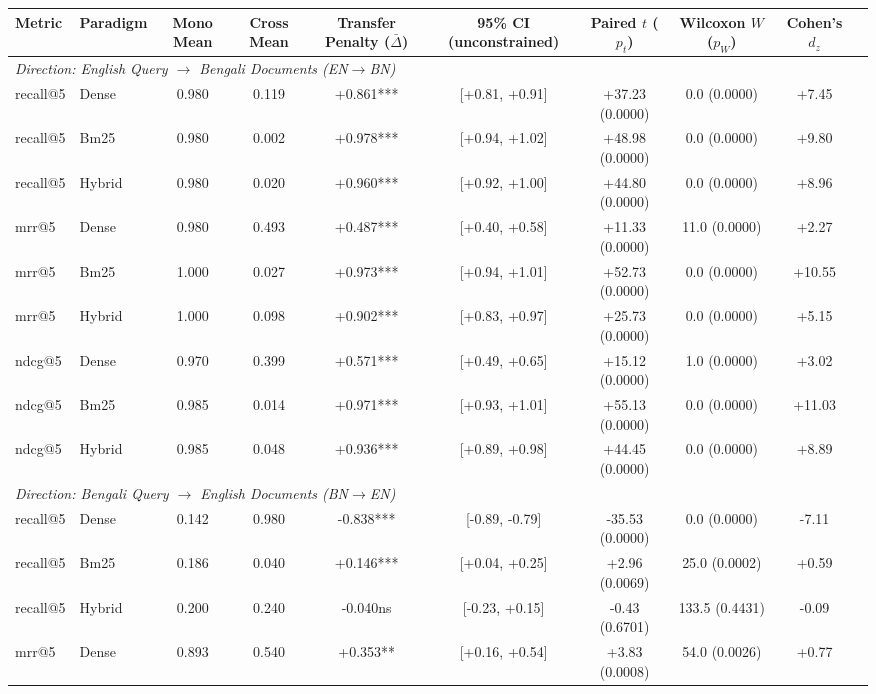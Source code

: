 \begin{table}[t]
\centering
\small
\begin{tabular}{llcccccccc}
\toprule
\textbf{Metric} & \textbf{Paradigm} & \textbf{Mono Mean} & \textbf{Cross Mean} & \textbf{Transfer Penalty ($\bar{\Delta}$)} & \textbf{95\% CI (unconstrained)} & \textbf{Paired $t$ ($p_t$)} & \textbf{Wilcoxon $W$ ($p_W$)} & \textbf{Cohen's $d_z$} \\
\midrule
\multicolumn{9}{l}{\textit{Direction: English Query $\to$ Bengali Documents (EN$\to$BN)}} \\
recall@5 & Dense & 0.980 & 0.119 & +0.861*** & [+0.81, +0.91] & +37.23 (0.0000) & 0.0 (0.0000) & +7.45 \\
recall@5 & Bm25 & 0.980 & 0.002 & +0.978*** & [+0.94, +1.02] & +48.98 (0.0000) & 0.0 (0.0000) & +9.80 \\
recall@5 & Hybrid & 0.980 & 0.020 & +0.960*** & [+0.92, +1.00] & +44.80 (0.0000) & 0.0 (0.0000) & +8.96 \\
mrr@5 & Dense & 0.980 & 0.493 & +0.487*** & [+0.40, +0.58] & +11.33 (0.0000) & 11.0 (0.0000) & +2.27 \\
mrr@5 & Bm25 & 1.000 & 0.027 & +0.973*** & [+0.94, +1.01] & +52.73 (0.0000) & 0.0 (0.0000) & +10.55 \\
mrr@5 & Hybrid & 1.000 & 0.098 & +0.902*** & [+0.83, +0.97] & +25.73 (0.0000) & 0.0 (0.0000) & +5.15 \\
ndcg@5 & Dense & 0.970 & 0.399 & +0.571*** & [+0.49, +0.65] & +15.12 (0.0000) & 1.0 (0.0000) & +3.02 \\
ndcg@5 & Bm25 & 0.985 & 0.014 & +0.971*** & [+0.93, +1.01] & +55.13 (0.0000) & 0.0 (0.0000) & +11.03 \\
ndcg@5 & Hybrid & 0.985 & 0.048 & +0.936*** & [+0.89, +0.98] & +44.45 (0.0000) & 0.0 (0.0000) & +8.89 \\
\midrule
\multicolumn{9}{l}{\textit{Direction: Bengali Query $\to$ English Documents (BN$\to$EN)}} \\
recall@5 & Dense & 0.142 & 0.980 & -0.838*** & [-0.89, -0.79] & -35.53 (0.0000) & 0.0 (0.0000) & -7.11 \\
recall@5 & Bm25 & 0.186 & 0.040 & +0.146*** & [+0.04, +0.25] & +2.96 (0.0069) & 25.0 (0.0002) & +0.59 \\
recall@5 & Hybrid & 0.200 & 0.240 & -0.040ns & [-0.23, +0.15] & -0.43 (0.6701) & 133.5 (0.4431) & -0.09 \\
mrr@5 & Dense & 0.893 & 0.540 & +0.353** & [+0.16, +0.54] & +3.83 (0.0008) & 54.0 (0.0026) & +0.77 \\

\end{tabular}
\end{table}
